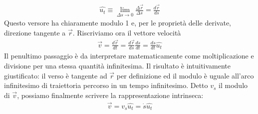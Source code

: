 \documentclass[10pt,a4paper]{article}
\begin{document}
\begin{align*}
	\hat{u_t} \equiv \lim_{\Delta s \to 0} \frac{\Delta \vec{r}}{\Delta s} = \frac{d\vec{r}}{ds}
\end{align*}
Questo versore ha chiaramente modulo 1 e, per le proprietà delle derivate, direzione tangente a $\vec{r}$. Riscriviamo ora il vettore velocità
\begin{align*}
	\vec{v} = \frac{d\vec{r}}{dt} = \frac{d\vec{r}}{ds} \frac{ds}{dt} = \frac{ds}{dt} \hat{u_t}
\end{align*}
Il penultimo passaggio è da interpretare matematicamente come moltiplicazione e divisione per una stessa quantità infinitesima. Il risultato è intuitivamente giustificato: il verso è tangente ad $\vec{r}$ per definizione ed il modulo è uguale all'arco infinitesimo di traiettoria percorso in un tempo infinitesimo. Detto $v_{s}$ il modulo di $\vec{v}$, possiamo finalmente scrivere la rappresentazione intrinseca: 
\begin{align*}
\vec{v} = v_s \hat{u_t} = \dot{s} \hat{u_t}
\end{align*}
\end{document}

